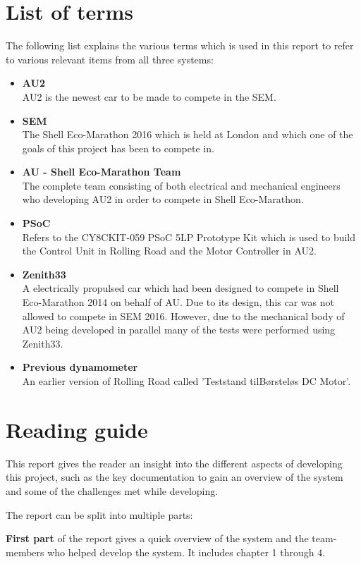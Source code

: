 \section{List of terms}
The following list explains the various terms which is used in this report to refer to various relevant items from all three systems:
\begin{itemize}
	\item \textbf{AU2}\\
	AU2 is the newest car to be made to compete in the SEM.	
	\item \textbf{SEM}\\
	The Shell Eco-Marathon 2016 which is held at London and which one of the goals of this project has been to compete in.
	\item \textbf{AU - Shell Eco-Marathon Team}\\
	The complete team consisting of both electrical and mechanical engineers who developing AU2 in order to compete in Shell Eco-Marathon.
	\item \textbf{PSoC}\\
	Refers to the CY8CKIT-059 PSoC 5LP Prototype Kit which is used to build the Control Unit in Rolling Road and the Motor Controller in AU2.
	\item \textbf{Zenith33}\\
	A electrically propulsed car which had been designed to compete in Shell Eco-Marathon 2014\cite{BAC_zenith33} on behalf of AU. Due to its design, this car was not allowed to compete in SEM 2016. However, due to the mechanical body of AU2 being developed in parallel many of the tests were performed using Zenith33.
	\item \textbf{Previous dynamometer}\\
	An earlier version of Rolling Road called 'Teststand tilBørsteløs DC Motor'\cite{BAC_rullefelt}. 
\end{itemize}

\section{Reading guide}

This report gives the reader an insight into the different aspects of developing this project, such as the key documentation to gain an overview of the system and some of the challenges met while developing.

The report can be split into multiple parts:

\textbf{First part} of the report gives a quick overview of the system and the team-members who helped develop the system. It includes chapter 1 through 4.

